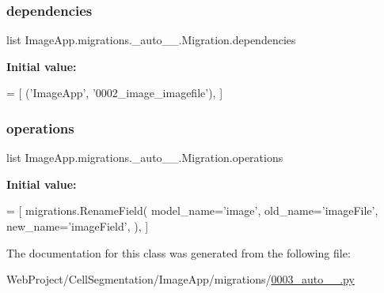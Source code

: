 \subsubsection{\texorpdfstring{dependencies}{dependencies}}
{\footnotesize\ttfamily list Image\+App.\+migrations.\+\_\+auto\+\_\+\_.\+Migration.\+dependencies\hspace{0.3cm}{\ttfamily [static]}}

{\bfseries Initial value\+:}
\begin{DoxyCode}
=  [
        (\textcolor{stringliteral}{'ImageApp'}, \textcolor{stringliteral}{'0002\_image\_imagefile'}),
    ]
\end{DoxyCode}
\mbox{\label{class_image_app_1_1migrations_1_10003__auto__20180818__1425_1_1_migration_aae609b480f1a2542bd52396572fc1574}} 
\subsubsection{\texorpdfstring{operations}{operations}}
{\footnotesize\ttfamily list Image\+App.\+migrations.\+\_\+auto\+\_\+\_.\+Migration.\+operations\hspace{0.3cm}{\ttfamily [static]}}

{\bfseries Initial value\+:}
\begin{DoxyCode}
=  [
        migrations.RenameField(
            model\_name=\textcolor{stringliteral}{'image'},
            old\_name=\textcolor{stringliteral}{'imageFile'},
            new\_name=\textcolor{stringliteral}{'imageField'},
        ),
    ]
\end{DoxyCode}


The documentation for this class was generated from the following file\+:\begin{DoxyCompactItemize}
\item 
Web\+Project/\+Cell\+Segmentation/\+Image\+App/migrations/\mbox{\hyperlink{0003__auto__20180818__1425_8py}{0003\+\_\+auto\+\_\+\_.\+py}}\end{DoxyCompactItemize}

